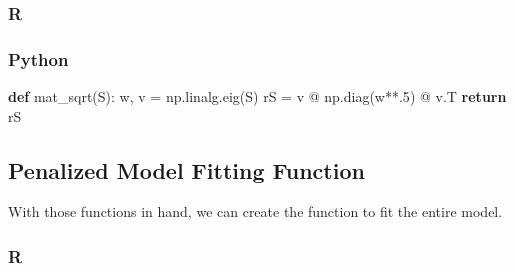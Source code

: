 \documentclass[
  letterpaper,
]{krantz}
\newenvironment{Shaded}{}{}
\newcommand{\AttributeTok}[1]{\textcolor[rgb]{0.49,0.56,0.16}{#1}}
\newcommand{\ConstantTok}[1]{\textcolor[rgb]{0.53,0.00,0.00}{#1}}
\newcommand{\ControlFlowTok}[1]{\textcolor[rgb]{0.00,0.44,0.13}{\textbf{#1}}}
\newcommand{\DecValTok}[1]{\textcolor[rgb]{0.25,0.63,0.44}{#1}}
\newcommand{\FloatTok}[1]{\textcolor[rgb]{0.25,0.63,0.44}{#1}}
\newcommand{\FunctionTok}[1]{\textcolor[rgb]{0.02,0.16,0.49}{#1}}
\newcommand{\KeywordTok}[1]{\textcolor[rgb]{0.00,0.44,0.13}{\textbf{#1}}}
\newcommand{\NormalTok}[1]{#1}
\newcommand{\OperatorTok}[1]{\textcolor[rgb]{0.40,0.40,0.40}{#1}}
\newcommand{\OtherTok}[1]{\textcolor[rgb]{0.00,0.44,0.13}{#1}}
\newcommand{\SpecialCharTok}[1]{\textcolor[rgb]{0.25,0.44,0.63}{#1}}
\begin{document}
\subsubsection{R}

\begin{Shaded}
\end{Shaded}

\subsubsection{Python}

\begin{Shaded}
\begin{Highlighting}[]
\KeywordTok{def}\NormalTok{ mat\_sqrt(S):}
\NormalTok{    w, v }\OperatorTok{=}\NormalTok{ np.linalg.eig(S)}
\NormalTok{    rS }\OperatorTok{=}\NormalTok{ v }\OperatorTok{@}\NormalTok{ np.diag(w}\OperatorTok{**}\FloatTok{.5}\NormalTok{) }\OperatorTok{@}\NormalTok{ v.T}
    \ControlFlowTok{return}\NormalTok{ rS}
\end{Highlighting}
\end{Shaded}

\subsection{Penalized Model Fitting
Function}\label{penalized-model-fitting-function}

With those functions in hand, we can create the function to fit the
entire model.

\subsubsection{R}
\end{document}
